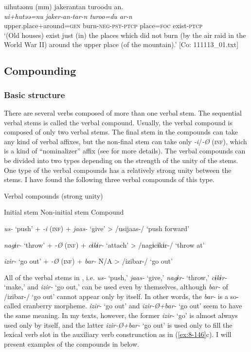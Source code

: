   {\TM}
\glll  uihutəənu  (mm)  {\textbar}jaker{\textbar}antan  turoodu  an.\\
\textit{ui+hutəə=nu}    \textit{jaker-an-tar-n  turoo=du  ar-n}\\
    upper.place+around=\textsc{gen}    burn-\textsc{neg}-\textsc{pst}-\textsc{ptcp}  place=\textsc{foc}  exist-\textsc{ptcp}\\
\glt ‘(Old houses) exist just (in) the places which did not burn (by the air raid in the World War II) around the upper place (of the mountain).’ [Co: 111113\_01.txt]
\z

\subsection{Compounding}
\subsubsection{Basic structure}

There are several verbs composed of more than one verbal stem. The sequential verbal stems is called the verbal compound. Usually, the verbal compound is composed of only two verbal stems. The final stem in the compounds can take any kind of verbal affixes, but the non-final stem can take only \textit{-i}/\textit{-Ø} (\textsc{inf}), which is a kind of “nominalizer” affix (see  for more details). The verbal compounds can be divided into two types depending on the strength of the unity of the stems. One type of the verbal compounds has a relatively strong unity between the stems. I have found the following three verbal compounds of this type.

\begin{table}
\caption{\label{tab:key:85}Verbal compounds (strong unity)}

Initial stem    Non-initial stem    Compound

\textit{us-}  ‘push’  +  \textit{-i} (\textsc{inf})  +  \textit{jaas-}  ‘give’  >  /usijaas-/  ‘push forward’

\textit{nagɨr-}  ‘throw’  +  \textit{-Ø} (\textsc{inf})  +  \textit{cɨkɨr-}  ‘attach’  >  /nagɨcɨkɨr-/  ‘throw at’

\textit{izir-}  ‘go out’  +  \textit{-Ø} (\textsc{inf})  +  \textit{bar-}  N/A  >  /izibar-/  ‘go out’
\end{table}

All of the verbal stems in , i.e. \textit{us-} ‘push,’ \textit{jaas-} ‘give,’ \textit{nagɨr-} ‘throw,’ \textit{cɨkɨr-} ‘make,’ and \textit{izir-} ‘go out,’ can be used even by themselves, although \textit{bar-} of /izibar-/ ‘go out’ cannot appear only by itself. In other words, the \textit{bar-} is a so-called cranberry morpheme. \textit{izir-} ‘go out’ and \textit{izir-Ø+bar-} ‘go out’ seem to have the same meaning. In my texts, however, the former \textit{izir-} ‘go’ is almost always used only by itself, and the latter \textit{izir-Ø+bar-} ‘go out’ is used only to fill the lexical verb slot in the auxiliary verb construnction as in (\ref{ex:8-146}c). I will present examples of the compounds in  below.

